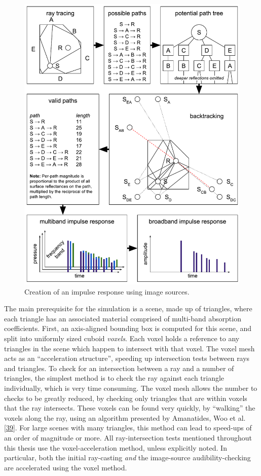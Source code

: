 \documentclass[]{scrreprt}
\begin{document}
\begin{figure}[htbp]
\centering
\includegraphics{images/image_source_process.pdf}
\caption{Creation of an impulse response using image
sources.\label{fig:image_source_process}}
\end{figure}

The main prerequisite for the simulation is a scene, made up of
triangles, where each triangle has an associated material comprised of
multi-band absorption coefficients. First, an axis-aligned bounding box
is computed for this scene, and split into uniformly sized cuboid
\emph{voxels}. Each voxel holds a reference to any triangles in the
scene which happen to intersect with that voxel. The voxel mesh acts as
an ``acceleration structure'', speeding up intersection tests between
rays and triangles. To check for an intersection between a ray and a
number of triangles, the simplest method is to check the ray against
each triangle individually, which is very time consuming. The voxel mesh
allows the number to checks to be greatly reduced, by checking only
triangles that are within voxels that the ray intersects. These voxels
can be found very quickly, by ``walking'' the voxels along the ray,
using an algorithm presented by Amanatides, Woo et al.
{[}\protect\hyperlink{ref-amanatidesux5ffastux5f1987}{39}{]}. For large
scenes with many triangles, this method can lead to speed-ups of an
order of magnitude or more. All ray-intersection tests mentioned
throughout this thesis use the voxel-acceleration method, unless
explicitly noted. In particular, both the initial ray-casting \emph{and}
the image-source audibility-checking are accelerated using the voxel
method.
\end{document}
